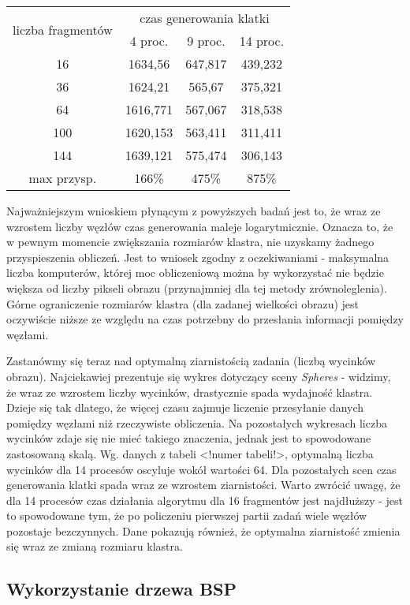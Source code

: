 \begin{longtable}{|c|c|c|c|} \hline
	    \multirow{2}{*}{liczba fragmentów} & \multicolumn{3}{|c|}{czas generowania klatki} \\ \cline{2-4}
	 	& 4 proc. & 9 proc. & 14 proc. \\ \hline
	    16 & 1634,56 & 647,817 & 439,232 \\ 
	    36 & 1624,21 & 565,67 & 375,321 \\
		64 & 1616,771 & 567,067 & 318,538 \\
		100 & 1620,153 & 563,411 & 311,411 \\
		144 & 1639,121 & 575,474 & 306,143 \\ \hline
		max przysp. & 166\% & 475\% & 875\%  \\
		\hline
\end{longtable}

Najważniejszym wnioskiem płynącym z powyższych badań jest to, że wraz ze wzrostem liczby węzłów czas generowania maleje logarytmicznie. Oznacza to, że w pewnym momencie zwiększania rozmiarów klastra, nie uzyskamy żadnego przyspieszenia obliczeń. Jest to wniosek zgodny z oczekiwaniami - maksymalna liczba komputerów, której moc obliczeniową można by wykorzystać nie będzie większa od liczby pikseli obrazu (przynajmniej dla tej metody zrównoleglenia). Górne ograniczenie rozmiarów klastra (dla zadanej wielkości obrazu) jest oczywiście niższe ze względu na czas potrzebny do przesłania informacji pomiędzy węzłami.

Zastanówmy się teraz nad optymalną ziarnistością zadania (liczbą wycinków obrazu). Najciekawiej prezentuje się wykres dotyczący sceny \emph{Spheres} - widzimy, że wraz ze wzrostem liczby wycinków, drastycznie spada wydajność klastra. Dzieje się tak dlatego, że więcej czasu zajmuje liczenie przesyłanie danych pomiędzy węzłami niż rzeczywiste obliczenia. Na pozostałych wykresach liczba wycinków zdaje się nie mieć takiego znaczenia, jednak jest to spowodowane zastosowaną skalą. Wg. danych z tabeli <!numer tabeli!>, optymalną liczba wycinków dla 14 procesów oscyluje wokół wartości 64. Dla pozostałych scen czas generowania klatki spada wraz ze wzrostem ziarnistości. Warto zwrócić uwagę, że dla 14 procesów czas działania algorytmu dla 16 fragmentów jest najdłuższy - jest to spowodowane tym, że po policzeniu pierwszej partii zadań wiele węzłów pozostaje bezczynnych. Dane pokazują również, że optymalna ziarnistość zmienia się wraz ze zmianą rozmiaru klastra.

\subsection{Wykorzystanie drzewa BSP}


